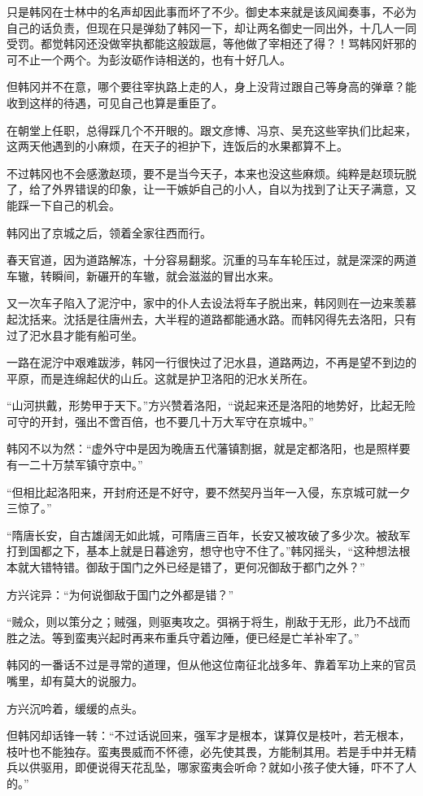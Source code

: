 只是韩冈在士林中的名声却因此事而坏了不少。御史本来就是该风闻奏事，不必为自己的话负责，但现在只是弹劾了韩冈一下，却让两名御史一同出外，十几人一同受罚。都觉韩冈还没做宰执都能这般跋扈，等他做了宰相还了得？！骂韩冈奸邪的可不止一个两个。为彭汝砺作诗相送的，也有十好几人。

但韩冈并不在意，哪个要往宰执路上走的人，身上没背过跟自己等身高的弹章？能收到这样的待遇，可见自己也算是重臣了。

在朝堂上任职，总得踩几个不开眼的。跟文彦博、冯京、吴充这些宰执们比起来，这两天他遇到的小麻烦，在天子的袒护下，连饭后的水果都算不上。

不过韩冈也不会感激赵顼，要不是当今天子，本来也没这些麻烦。纯粹是赵顼玩脱了，给了外界错误的印象，让一干嫉妒自己的小人，自以为找到了让天子满意，又能踩一下自己的机会。

韩冈出了京城之后，领着全家往西而行。

春天官道，因为道路解冻，十分容易翻浆。沉重的马车车轮压过，就是深深的两道车辙，转瞬间，新碾开的车辙，就会滋滋的冒出水来。

又一次车子陷入了泥泞中，家中的仆人去设法将车子脱出来，韩冈则在一边来羡慕起沈括来。沈括是往唐州去，大半程的道路都能通水路。而韩冈得先去洛阳，只有过了汜水县才能有船可坐。

一路在泥泞中艰难跋涉，韩冈一行很快过了汜水县，道路两边，不再是望不到边的平原，而是连绵起伏的山丘。这就是护卫洛阳的汜水关所在。

“山河拱戴，形势甲于天下。”方兴赞着洛阳，“说起来还是洛阳的地势好，比起无险可守的开封，强出不啻百倍，也不要几十万大军守在京城中。”

韩冈不以为然：“虚外守中是因为晚唐五代藩镇割据，就是定都洛阳，也是照样要有一二十万禁军镇守京中。”

“但相比起洛阳来，开封府还是不好守，要不然契丹当年一入侵，东京城可就一夕三惊了。”

“隋唐长安，自古雄阔无如此城，可隋唐三百年，长安又被攻破了多少次。被敌军打到国都之下，基本上就是日暮途穷，想守也守不住了。”韩冈摇头，“这种想法根本就大错特错。御敌于国门之外已经是错了，更何况御敌于都门之外？”

方兴诧异：“为何说御敌于国门之外都是错？”

“贼众，则以策分之；贼强，则驱夷攻之。弭祸于将生，削敌于无形，此乃不战而胜之法。等到蛮夷兴起时再来布重兵守着边陲，便已经是亡羊补牢了。”

韩冈的一番话不过是寻常的道理，但从他这位南征北战多年、靠着军功上来的官员嘴里，却有莫大的说服力。

方兴沉吟着，缓缓的点头。

但韩冈却话锋一转：“不过话说回来，强军才是根本，谋算仅是枝叶，若无根本，枝叶也不能独存。蛮夷畏威而不怀德，必先使其畏，方能制其用。若是手中并无精兵以供驱用，即便说得天花乱坠，哪家蛮夷会听命？就如小孩子使大锤，吓不了人的。”

